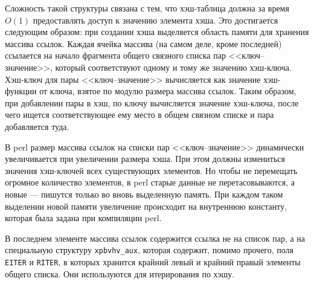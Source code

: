 \begin{figure}[H]
\end{figure}
Сложность такой структуры связана с тем, что хэш-таблица должна за время $O(1)$ предоставлять доступ к значению элемента хэша. Это достигается следующим образом: при создании хэша выделяется область памяти для хранения массива ссылок. Каждая ячейка массива (на самом деле, кроме последней) ссылается на начало фрагмента общего связного списка пар <<ключ--значение>>, который соответствуют одному и тому же значению хэш-ключа. Хэш-ключ для пары <<ключ--значение>> вычисляется как значение хэш-функции от ключа, взятое по модулю размера массива ссылок. Таким образом, при добавлении пары в хэш, по ключу вычисляется значение хэш-ключа, после чего ищется соответствующее ему место в общем связном списке и пара добавляется туда.

В perl размер массива ссылок на списки пар <<ключ--значение>> динамически увеличивается при увеличении размера хэша. При этом должны измениться значения хэш-ключей всех существующих элементов. Но чтобы не перемещать огромное количество элементов, в perl старые данные не перетасовываются, а новые --- пишутся только во вновь выделенную память. При каждом таком выделении новой памяти увеличение происходит на внутреннюю константу, которая была задана при компиляции perl.

В последнем элементе массива ссылок содержится ссылка не на список пар, а на специальную структуру \verb|xpbvhv_aux|, которая содержит, помимо прочего, поля \verb|EITER| и  \verb|RITER|, в которых хранится крайний левый и крайний правый элементы общего списка. Они используются для итерирования по хэшу.

